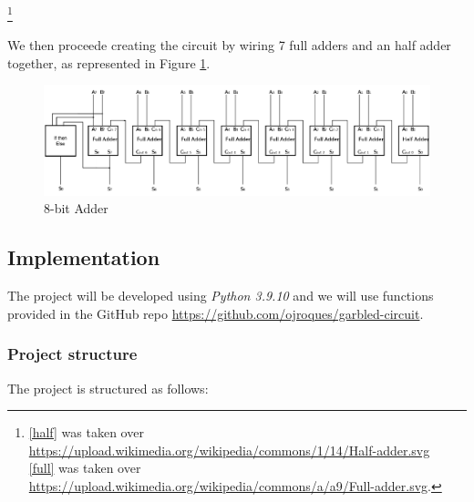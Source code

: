 \documentclass[12pt]{article}
\begin{document}
\footnote{\ref{half} was taken over \url{https://upload.wikimedia.org/wikipedia/commons/1/14/Half-adder.svg}\\ 
\ref{full} was taken over \url{https://upload.wikimedia.org/wikipedia/commons/a/a9/Full-adder.svg}.}

We then proceede creating the circuit by wiring 7 full adders and an half adder together, as represented in Figure \ref{circuit}.

\begin{figure}[!h]
    \centering
    \includegraphics[width=1\linewidth]{../src/images/Circuit.png}
    \caption{8-bit Adder}\label{circuit}
\end{figure}
\vfill
\subsection{Implementation}
The project will be developed using \textit{Python 3.9.10} and we will use functions provided in the GitHub repo \url{https://github.com/ojroques/garbled-circuit}.
\subsubsection{Project structure}
The project is structured as follows:



 
\end{document}
